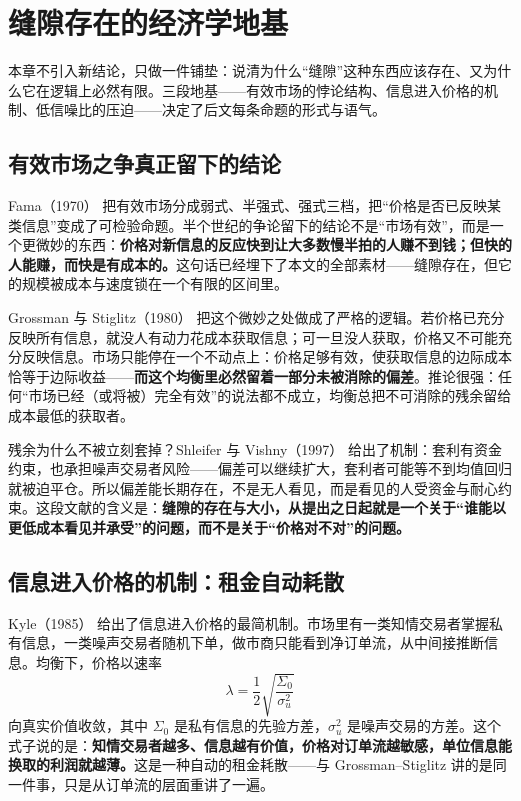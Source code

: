 \section{缝隙存在的经济学地基}\label{sec:economics}

本章不引入新结论，只做一件铺垫：说清为什么“缝隙”这种东西应该存在、又为什么它在逻辑上必然有限。三段地基——有效市场的悖论结构、信息进入价格的机制、低信噪比的压迫——决定了后文每条命题的形式与语气。

\subsection{有效市场之争真正留下的结论}

Fama（1970）\cite{fama1970} 把有效市场分成弱式、半强式、强式三档，把“价格是否已反映某类信息”变成了可检验命题。半个世纪的争论留下的结论不是“市场有效”，而是一个更微妙的东西：\textbf{价格对新信息的反应快到让大多数慢半拍的人赚不到钱；但快的人能赚，而快是有成本的。}这句话已经埋下了本文的全部素材——缝隙存在，但它的规模被成本与速度锁在一个有限的区间里。

Grossman 与 Stiglitz（1980）\cite{grossmanstiglitz1980} 把这个微妙之处做成了严格的逻辑。若价格已充分反映所有信息，就没人有动力花成本获取信息；可一旦没人获取，价格又不可能充分反映信息。市场只能停在一个不动点上：价格足够有效，使获取信息的边际成本恰等于边际收益——\textbf{而这个均衡里必然留着一部分未被消除的偏差}。推论很强：任何“市场已经（或将被）完全有效”的说法都不成立，均衡总把不可消除的残余留给成本最低的获取者。

残余为什么不被立刻套掉？Shleifer 与 Vishny（1997）\cite{shleifer1997} 给出了机制：套利有资金约束，也承担噪声交易者风险——偏差可以继续扩大，套利者可能等不到均值回归就被迫平仓。所以偏差能长期存在，不是无人看见，而是看见的人受资金与耐心约束。这段文献的含义是：\textbf{缝隙的存在与大小，从提出之日起就是一个关于“谁能以更低成本看见并承受”的问题，而不是关于“价格对不对”的问题。}

\subsection{信息进入价格的机制：租金自动耗散}

Kyle（1985）\cite{kyle1985} 给出了信息进入价格的最简机制。市场里有一类知情交易者掌握私有信息，一类噪声交易者随机下单，做市商只能看到净订单流，从中间接推断信息。均衡下，价格以速率
\begin{equation}
  \lambda = \frac{1}{2}\sqrt{\frac{\Sigma_0}{\sigma_u^2}}
\end{equation}
向真实价值收敛，其中 $\Sigma_0$ 是私有信息的先验方差，$\sigma_u^2$ 是噪声交易的方差。这个式子说的是：\textbf{知情交易者越多、信息越有价值，价格对订单流越敏感，单位信息能换取的利润就越薄。}这是一种自动的租金耗散——与 Grossman--Stiglitz 讲的是同一件事，只是从订单流的层面重讲了一遍。


